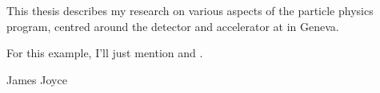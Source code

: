 \begin{preface}
    This thesis describes my research on various aspects of the \LHCb
    particle physics program, centred around the \LHCb detector and \LHC
    accelerator at \CERN in Geneva.

    \noindent
    For this example, I'll just mention 
    and .
\end{preface}

\tableofcontents

%
{James Joyce}
\thispagestyle{empty}
